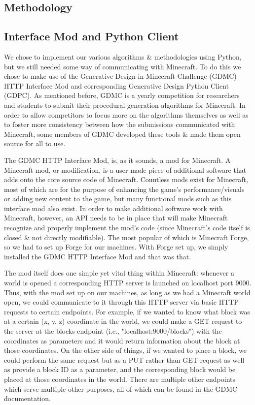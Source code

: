 \documentclass[11pt, oneside]{article}
\begin{document}
\begin{normalsize}
\section{Methodology}
\label{Methodology}

\subsection{Interface Mod and Python Client}

We chose to implement our various algorithms \& methodologies using Python, but we still needed some way of communicating with Minecraft. 
To do this we chose to make use of the Generative Design in Minecraft Challenge (GDMC) HTTP Interface Mod and corresponding Generative Design Python Client (GDPC). 
As mentioned before, GDMC is a yearly competition for researchers and students to submit their procedural generation algorithms for Minecraft. 
In order to allow competitors to focus more on the algorithms themselves as well as to foster more consistency between how the submissions communicated with Minecraft, some members of GDMC developed these tools \& made them open source for all to use. 

The GDMC HTTP Interface Mod, is, as it sounds, a mod for Minecraft. 
A Minecraft mod, or modification, is a user made piece of additional software that adds onto the core source code of Minecraft. 
Countless mods exist for Minecraft, most of which are for the purpose of enhancing the game's performance/visuals or adding new content to the game, but many functional mods such as this interface mod also exist. 
In order to make additional software work with Minecraft, however, an API needs to be in place that will make Minecraft recognize and properly implement the mod's code (since Minecraft's code itself is closed \& not directly modifiable).
The most popular of which is Minecraft Forge, so we had to set up Forge for our machines. 
With Forge set up, we simply installed the GDMC HTTP Interface Mod and that was that. 

The mod itself does one simple yet vital thing within Minecraft: whenever a world is opened a corresponding HTTP server is launched on localhost port 9000. 
Thus, with the mod set up on our machines, as long as we had a Minecraft world open, we could communicate to it through this HTTP server via basic HTTP requests to certain endpoints. 
For example, if we wanted to know what block was at a certain (x, y, z) coordinate in the world, we could make a GET request to the server at the blocks endpoint (i.e., "localhost:9000/blocks") with the coordinates as parameters and it would return information about the block at those coordinates. 
On the other side of things, if we wanted to place a block, we could perform the same request but as a PUT rather than GET request as well as provide a block ID as a parameter, and the corresponding block would be placed at those coordinates in the world. 
There are multiple other endpoints which serve multiple other purposes, all of which can be found in the GDMC documentation. 


\end{normalsize}
\end{document}
